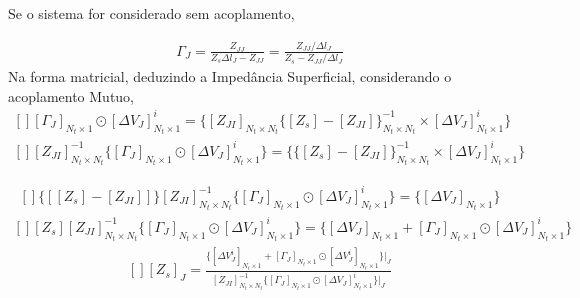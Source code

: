 \documentclass[
	12pt,				%
	openright,			%
	oneside,			%
	a4papey79r,			%
	english,			%
	brazil				%
	]{abntex2}
\begin{document}
Se o sistema for considerado sem acoplamento,

\begin{equation}
\begin{aligned}
  \Gamma_J = 
  \frac{ Z_{JJ}}{Z_{s} \Delta l_J-Z_{JJ} } =  \frac{ Z_{JJ}/\Delta l_J}{Z_{s} -Z_{JJ}/\Delta l_J } 
   \end{aligned}
\end{equation}
Na forma matricial, deduzindo a Impedância Superficial, considerando o acoplamento Mutuo,
\begin{equation}
\begin{aligned}
[][ \Gamma_J  
 ]_{N_t \times 1} \odot [{\Delta V_J}]^i_{N_t \times 1}=
  \biggl\{[Z_{JI}]_{N_t \times N_t} \{ [Z_{s}]-[Z_{JI}]\}^{-1}_{N_t \times N_t} \times [{\Delta V_J}]^i_{N_t \times 1}\biggl\} 
  
   \end{aligned}
\end{equation}
\begin{equation}
\begin{aligned}
[][Z_{JI}]^{-1}_{N_t \times N_t} \biggl\{[ \Gamma_J  
 ]_{N_t \times 1} \odot [{\Delta V_J}]^i_{N_t \times 1}\biggl\} =
  \biggl\{\{ [Z_{s}]-[Z_{JI}]\}^{-1}_{N_t \times N_t} \times [{\Delta V_J}]^i_{N_t \times 1} \biggl\} 
  
   \end{aligned}
\end{equation}

\begin{equation}
\begin{aligned}
[]\{ [[Z_{s}]-[Z_{JI}]]\}[Z_{JI}]^{-1}_{N_t \times N_t} \biggl\{[ \Gamma_J  
 ]_{N_t \times 1} \odot [{\Delta V_J}]^i_{N_t \times 1}\biggl\} =
  \biggl\{[\Delta V_J]_{N_t \times 1} \biggl\} 
  
   \end{aligned}
\end{equation}
\begin{equation}
\begin{aligned}
[] [Z_{s}][Z_{JI}]^{-1}_{N_t \times N_t} \biggl\{[ \Gamma_J  
 ]_{N_t \times 1} \odot [{\Delta V_J}]^i_{N_t \times 1}\biggl\} =
  \biggl\{[\Delta V_J]_{N_t \times 1}  +[ \Gamma_J  
 ]_{N_t \times 1} \odot [{\Delta V_J}]^i_{N_t \times 1}\biggl\}
  
   \end{aligned}
\end{equation}
\begin{equation}
\begin{aligned}
 [] [Z_{s}]_J = 
  \frac{  \biggl\{[\Delta V_J^i]_{N_t \times 1}  +[ \Gamma_J  
 ]_{N_t \times 1} \odot [{\Delta V_J^i}]_{N_t \times 1}\biggl\} \bigg|_{J}}
 {[Z_{JI}]^{-1}_{N_t \times N_t} \biggl\{[ \Gamma_J  
 ]_{N_t \times 1} \odot [{\Delta V_J}]^i_{N_t \times 1}\biggl\}\bigg|_{J}} 
   \end{aligned}
\end{equation}
\end{document}
